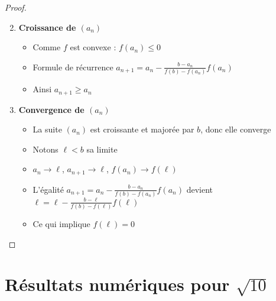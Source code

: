 \begin{frame}
\begin{proof}
\begin{enumerate}  
  \setcounter{enumi}{1}
  \item \textbf{Croissance de $(a_n)$}
  
\pause  

 
  \begin{itemize}\setlength{\itemsep}{4pt}
    \item Comme $f$ est convexe : $f(a_n)\le 0$ 
\pause     
    \item Formule de récurrence $a_{n+1} = a_n - \frac{b-a_n}{f(b)-f(a_n)}f(a_n)$
\pause 
    \item Ainsi $a_{n+1} \ge a_n$
  \end{itemize}
  
\pause
\bigskip

  \item \textbf{Convergence de $(a_n)$}
\pause    
  \begin{itemize}\setlength{\itemsep}{4pt}
    \item La suite $(a_n)$ est croissante et majorée par $b$, donc elle converge
\pause    
    \item Notons $\ell<b$ sa limite
\pause    
    \item $a_n \to \ell$, $a_{n+1} \to \ell$, $f(a_n)\to f(\ell)$
\pause    
    \item L'égalité $a_{n+1} = a_n - \frac{b-a_n}{f(b)-f(a_n)}f(a_n)$ devient 
  $\ell = \ell - \frac{b-\ell}{f(b)-f(\ell)} f(\ell)$
\pause  
    \item Ce qui implique $f(\ell)=0$ \qedhere
  \end{itemize}
  
\end{enumerate}

\end{proof}
\end{frame}


\section{Résultats numériques pour $\sqrt{10}$}

